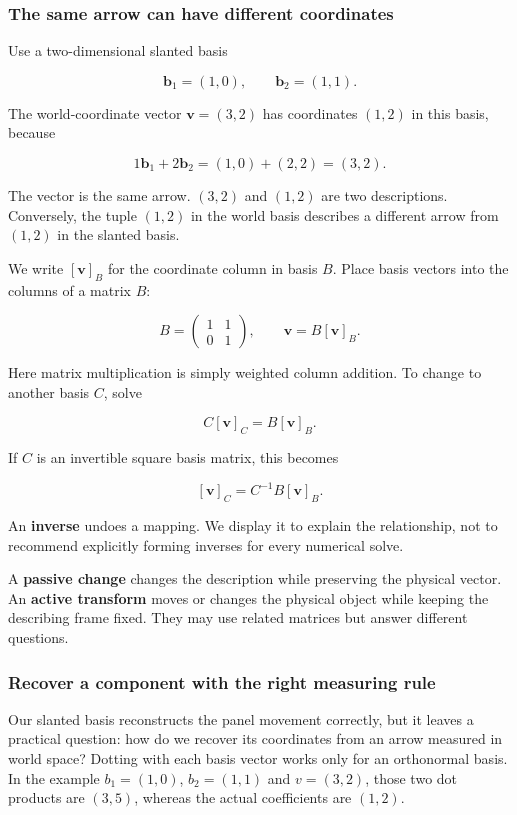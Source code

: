 \subsubsection{The same arrow can have different coordinates}\label{the-same-arrow-can-have-different-coordinates}

Use a two-dimensional slanted basis

\[
\mathbf b_1=(1,0),\qquad \mathbf b_2=(1,1).
\]

The world-coordinate vector \(\mathbf v=(3,2)\) has coordinates \((1,2)\) in this basis, because

\[
1\mathbf b_1+2\mathbf b_2=(1,0)+(2,2)=(3,2).
\]

The vector is the same arrow. \((3,2)\) and \((1,2)\) are two descriptions. Conversely, the tuple \((1,2)\) in the world basis describes a different arrow from \((1,2)\) in the slanted basis.

We write \([\mathbf v]_B\) for the coordinate column in basis \(B\). Place basis vectors into the columns of a matrix \(B\):

\[
B=\begin{pmatrix}1&1\\0&1\end{pmatrix},\qquad
\mathbf v=B[\mathbf v]_B.
\]

Here matrix multiplication is simply weighted column addition. To change to another basis \(C\), solve

\[
C[\mathbf v]_C=B[\mathbf v]_B.
\]

If \(C\) is an invertible square basis matrix, this becomes

\[
[\mathbf v]_C=C^{-1}B[\mathbf v]_B.
\]

An \textbf{inverse} undoes a mapping. We display it to explain the relationship, not to recommend explicitly forming inverses for every numerical solve.

A \textbf{passive change} changes the description while preserving the physical vector. An \textbf{active transform} moves or changes the physical object while keeping the describing frame fixed. They may use related matrices but answer different questions.

\subsubsection{Recover a component with the right measuring rule}\label{recover-a-component-with-the-right-measuring-rule}

Our slanted basis reconstructs the panel movement correctly, but it leaves a practical question: how do we recover its coordinates from an arrow measured in world space? Dotting with each basis vector works only for an orthonormal basis. In the example \(b_1=(1,0)\), \(b_2=(1,1)\) and \(v=(3,2)\), those two dot products are \((3,5)\), whereas the actual coefficients are \((1,2)\).

